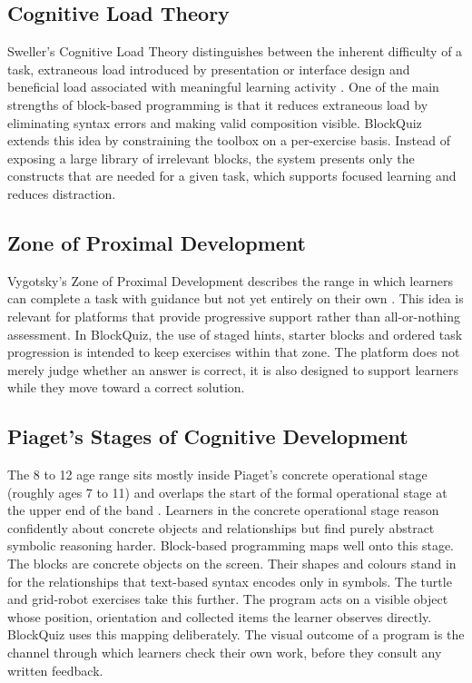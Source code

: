 \subsection{Cognitive Load Theory}
Sweller's Cognitive Load Theory distinguishes between the inherent difficulty of a task, extraneous load introduced by presentation or interface design and
beneficial load associated with meaningful learning activity \cite{sweller1988}.
One of the main strengths of block-based programming is that it reduces extraneous load by eliminating syntax errors and making valid composition visible.
BlockQuiz extends this idea by constraining the toolbox on a per-exercise basis.
Instead of exposing a large library of irrelevant blocks, the system presents only the constructs that are needed for a given task, which
supports focused learning and reduces distraction.


\subsection{Zone of Proximal Development}
Vygotsky's Zone of Proximal Development describes the range in which learners can complete a task with guidance but not yet entirely on their own \cite{Vygotsky1980, Shabani}.
This idea is relevant for platforms that provide progressive support rather than all-or-nothing assessment. In BlockQuiz, the use of staged hints, starter blocks and ordered
task progression is intended to keep exercises within that zone. The platform does not merely judge whether an answer is correct, it is also
designed to support learners while they move toward a correct solution.



\subsection{Piaget's Stages of Cognitive Development}
The 8 to 12 age range sits mostly inside Piaget's concrete operational stage (roughly ages 7 to 11) and overlaps the start 
of the formal operational stage at the upper end of the band \cite{PiagetInhelder1969}. Learners 
in the concrete operational stage reason confidently about concrete objects and relationships but find purely abstract symbolic reasoning harder. 
Block-based programming maps well onto this stage. The blocks are concrete objects on the screen. 
Their shapes and colours stand in for the relationships that text-based syntax encodes only in symbols. 
The turtle and grid-robot exercises take this further. 
The program acts on a visible object whose position, orientation and collected items the learner observes directly. 
BlockQuiz uses this mapping deliberately. The visual outcome of a program is the channel through which learners 
check their own work, before they consult any written feedback. 

